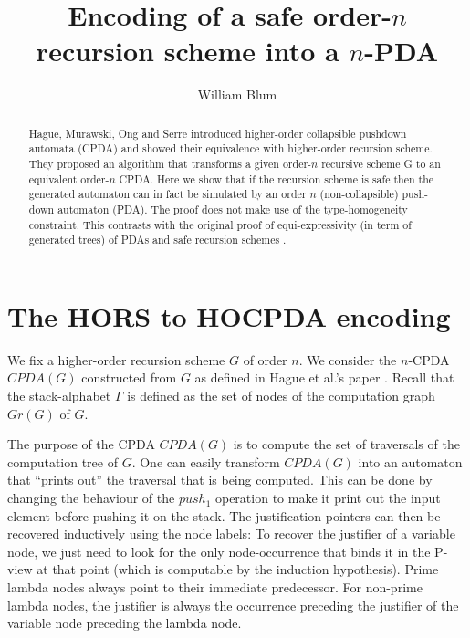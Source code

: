 \documentclass[a4paper]{article}
\author{William Blum}
\title{Encoding of a safe order-$n$ recursion scheme into a $n$-PDA}
\theoremstyle{remark}
\theoremstyle{definition}
\begin{document}
\maketitle
\begin{abstract}
Hague, Murawski, Ong and Serre \cite{hmos-lics08} introduced
higher-order collapsible pushdown automata (CPDA) and showed their
equivalence with higher-order recursion scheme. They proposed an
algorithm that transforms a given order-$n$ recursive  scheme G to
an equivalent order-$n$ CPDA. Here we show that if the recursion
scheme is safe then the generated automaton can in fact be simulated by an order
$n$ (non-collapsible) push-down automaton (PDA). The proof does not make
use of the type-homogeneity constraint. This contrasts with the original proof
of equi-expressivity (in term of generated trees) of PDAs and safe recursion schemes \cite{KNU02}.
\end{abstract}




\section{The HORS to HOCPDA encoding}

We fix a higher-order recursion scheme $G$ of order $n$.
We consider the $n$-CPDA $CPDA(G)$ constructed from $G$ as defined in Hague et al.'s paper \cite[Definition 5.2]{hague-collaps-full}.
Recall that the stack-alphabet $\Gamma$ is defined as the set of nodes of the computation graph $Gr(G)$ of $G$.

The purpose of the CPDA $CPDA(G)$ is to compute the set of traversals of the computation tree of $G$. One can easily transform $CPDA(G)$ into an automaton that ``prints out'' the traversal that is being computed. This can be done by changing the behaviour of the $push_1$ operation to make it print out the input element before pushing it on the stack. The justification pointers can then be recovered inductively using the node labels: To recover the justifier of a variable node, we just need to look for the only node-occurrence that binds it in the P-view at that point (which is computable by the induction hypothesis).
Prime lambda nodes always point to their immediate predecessor. For non-prime lambda nodes, the justifier is always the occurrence preceding the justifier of the variable node preceding the lambda node.
\end{document}
